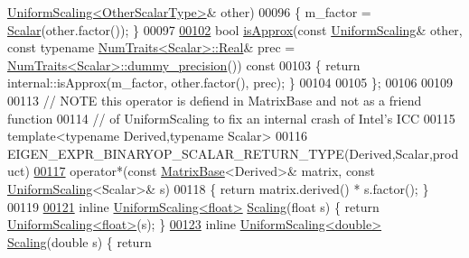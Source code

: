 \begin{DoxyCode}
      \hyperlink{class_eigen_1_1_uniform_scaling}{UniformScaling<OtherScalarType>}& other)
00096   \{ m\_factor = \hyperlink{class_eigen_1_1_uniform_scaling_a04c4339f58f1210c5d4d34b1bd7ae283}{Scalar}(other.factor()); \}
00097 
\hyperlink{class_eigen_1_1_uniform_scaling_a7f736fdbe43f7bce3d277312efdc315e}{00102}   \textcolor{keywordtype}{bool} \hyperlink{class_eigen_1_1_uniform_scaling_a7f736fdbe43f7bce3d277312efdc315e}{isApprox}(\textcolor{keyword}{const} \hyperlink{class_eigen_1_1_uniform_scaling}{UniformScaling}& other, \textcolor{keyword}{const} \textcolor{keyword}{typename} 
      \hyperlink{group___core___module_struct_eigen_1_1_num_traits}{NumTraits<Scalar>::Real}& prec = 
      \hyperlink{group___core___module_struct_eigen_1_1_num_traits}{NumTraits<Scalar>::dummy\_precision}())\textcolor{keyword}{ const}
00103 \textcolor{keyword}{  }\{ \textcolor{keywordflow}{return} internal::isApprox(m\_factor, other.factor(), prec); \}
00104 
00105 \};
00106 
00109 
00113 \textcolor{comment}{// NOTE this operator is defiend in MatrixBase and not as a friend function}
00114 \textcolor{comment}{// of UniformScaling to fix an internal crash of Intel's ICC}
00115 \textcolor{keyword}{template}<\textcolor{keyword}{typename} Derived,\textcolor{keyword}{typename} Scalar>
00116 EIGEN\_EXPR\_BINARYOP\_SCALAR\_RETURN\_TYPE(Derived,Scalar,product)
\hyperlink{group___geometry___module_ga8f79e131479dbe709ee1173b1be9a8f0}{00117} operator*(const \hyperlink{group___core___module_class_eigen_1_1_matrix_base}{MatrixBase}<Derived>& matrix, const \hyperlink{class_eigen_1_1_uniform_scaling}{UniformScaling}<Scalar>& s)
00118 \{ \textcolor{keywordflow}{return} matrix.derived() * s.factor(); \}
00119 
\hyperlink{group___geometry___module_ga23a8ed57e3f2973526026765ae697761}{00121} \textcolor{keyword}{inline} \hyperlink{class_eigen_1_1_uniform_scaling}{UniformScaling<float>} \hyperlink{group___geometry___module_ga23a8ed57e3f2973526026765ae697761}{Scaling}(\textcolor{keywordtype}{float} s) \{ \textcolor{keywordflow}{return} 
      \hyperlink{class_eigen_1_1_uniform_scaling}{UniformScaling<float>}(s); \}
\hyperlink{group___geometry___module_ga86bf75d7fd4a67bf9c2c7354d8e5e2af}{00123} \textcolor{keyword}{inline} \hyperlink{class_eigen_1_1_uniform_scaling}{UniformScaling<double>} \hyperlink{group___geometry___module_ga23a8ed57e3f2973526026765ae697761}{Scaling}(\textcolor{keywordtype}{double} s) \{ \textcolor{keywordflow}{return} 

\end{DoxyCode}
